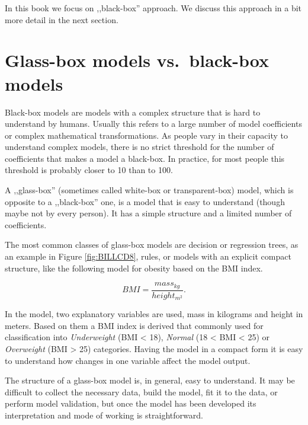 \documentclass[]{krantz}
\begin{document}
In this book we focus on ,,black-box'' approach. We discuss this approach in a bit more detail in the next section.

\hypertarget{glass-box-models-vs.black-box-models}{%
\section{Glass-box models vs.~black-box models}\label{glass-box-models-vs.black-box-models}}

Black-box models are models with a complex structure that is hard to understand by humans. Usually this refers to a large number of model coefficients or complex mathematical transformations. As people vary in their capacity to understand complex models, there is no strict threshold for the number of coefficients that makes a model a black-box. In practice, for most people this threshold is probably closer to 10 than to 100.

A ,,glass-box'' (sometimes called white-box or transparent-box) model, which is opposite to a ,,black-box'' one, is a model that is easy to understand (though maybe not by every person). It has a simple structure and a limited number of coefficients.

The most common classes of glass-box models are decision or regression trees, as an example in Figure \ref{fig:BILLCD8}, rules, or models with an explicit compact structure, like the following model for obesity based on the BMI index.

\[
BMI = \frac{mass_{kg}}{height_{m^2}}.
\]

In the model, two explanatory variables are used, mass in kilograms and height in meters. Based on them a BMI index is derived that commonly used for classification into \emph{Underweight} (BMI \textless{} 18), \emph{Normal} (18 \textless{} BMI \textless{} 25) or \emph{Overweight} (BMI \textgreater{} 25) categories. Having the model in a compact form it is easy to understand how changes in one variable affect the model output.

The structure of a glass-box model is, in general, easy to understand. It may be difficult to collect the necessary data, build the model, fit it to the data, or perform model validation, but once the model has been developed its interpretation and mode of working is straightforward.
\end{document}
